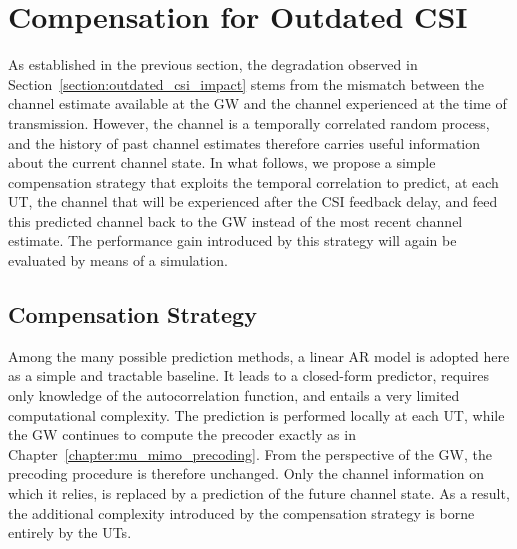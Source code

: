\section{Compensation for Outdated CSI}
\label{section:outdated_csi_compensation}

As established in the previous section, the degradation observed in Section~\ref{section:outdated_csi_impact} stems from the mismatch between the channel estimate available at the \ac{GW} and the channel experienced at the time of transmission.
However, the channel is a temporally correlated random process, and the history of past channel estimates therefore carries useful information about the current channel state.
In what follows, we propose a simple compensation strategy that exploits the temporal correlation to predict, at each \ac{UT}, the channel that will be experienced after the \ac{CSI} feedback delay, and feed this predicted channel back to the \ac{GW} instead of the most recent channel estimate.
The performance gain introduced by this strategy will again be evaluated by means of a simulation.

\subsection{Compensation Strategy}
\label{subsection:compensation_strategy}

Among the many possible prediction methods, a linear \acf{AR} model is adopted here as a simple and tractable baseline. It leads to a closed-form predictor, requires only knowledge of the autocorrelation function, and entails a very limited computational complexity.
The prediction is performed locally at each \ac{UT}, while the \ac{GW} continues to compute the precoder exactly as in Chapter~\ref{chapter:mu_mimo_precoding}. From the perspective of the \ac{GW}, the precoding procedure is therefore unchanged. Only the channel information on which it relies, is replaced by a prediction of the future channel state. As a result, the additional complexity introduced by the compensation strategy is borne entirely by the \acp{UT}.

